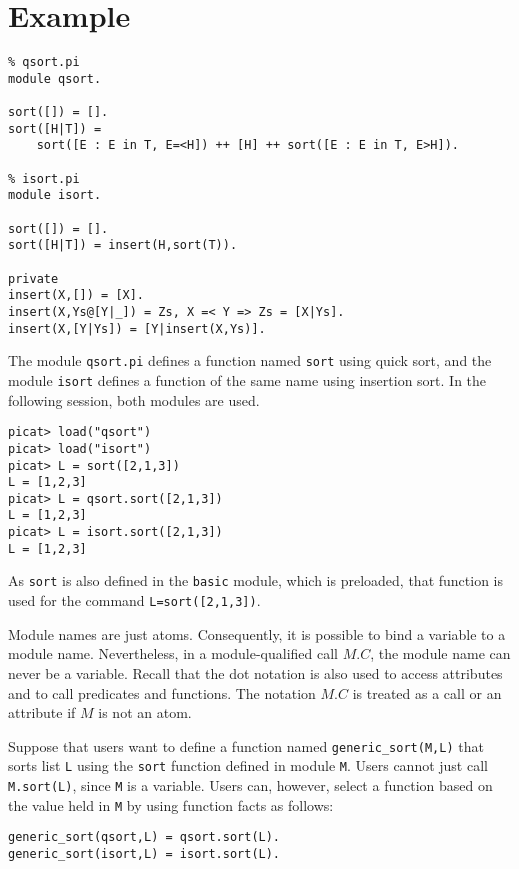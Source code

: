 \section*{Example}
\begin{verbatim}
% qsort.pi
module qsort.

sort([]) = [].
sort([H|T]) = 
    sort([E : E in T, E=<H]) ++ [H] ++ sort([E : E in T, E>H]).

% isort.pi
module isort.

sort([]) = [].
sort([H|T]) = insert(H,sort(T)).

private
insert(X,[]) = [X].
insert(X,Ys@[Y|_]) = Zs, X =< Y => Zs = [X|Ys].
insert(X,[Y|Ys]) = [Y|insert(X,Ys)].
\end{verbatim}
The module \texttt{qsort.pi} defines a function named \texttt{sort} using quick sort, and the module \texttt{isort} defines a function of the same name using insertion sort. In the following session, both modules are used.
\begin{verbatim}
picat> load("qsort")
picat> load("isort")
picat> L = sort([2,1,3])
L = [1,2,3]
picat> L = qsort.sort([2,1,3])
L = [1,2,3]
picat> L = isort.sort([2,1,3])
L = [1,2,3]
\end{verbatim}
As \texttt{sort} is also defined in the \texttt{basic} module, which is preloaded, that function is used for the command \texttt{L=sort([2,1,3])}.

Module names are just atoms. Consequently, it is possible to bind a variable to a module name. Nevertheless, in a module-qualified call $M.C$, the module name can never be a variable. Recall that the dot notation is also used to access attributes and to call predicates and functions. The notation $M.C$ is treated as a call or an attribute if $M$ is not an atom.

Suppose that users want to define a function named \texttt{generic\_sort(M,L)} that sorts list \texttt{L} using the \texttt{sort} function defined in module \texttt{M}. Users cannot just call \texttt{M.sort(L)}, since \texttt{M} is a variable. Users can, however, select a function based on the value held in \texttt{M} by using function facts as follows:
\begin{verbatim}
generic_sort(qsort,L) = qsort.sort(L).
generic_sort(isort,L) = isort.sort(L).
\end{verbatim}

